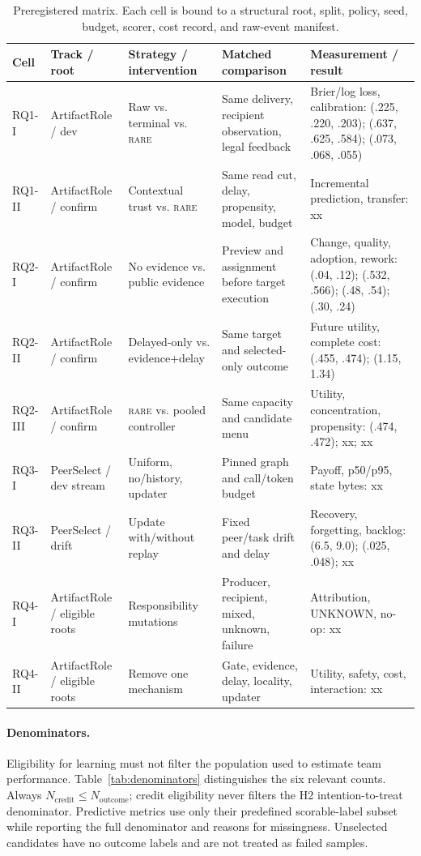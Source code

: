 \documentclass[sigconf,anonymous]{aamas}
\newcommand{\rare}{\textsc{rare}}
\begin{document}
\begin{table}[t]
\centering\small
\setlength{\tabcolsep}{2.6pt}
\begin{tabular}{p{}p{}p{}p{}p{}}
\toprule
Cell & Track / root & Strategy / intervention & Matched comparison & Measurement / result \\
\midrule
RQ1-I & ArtifactRole / dev & Raw vs. terminal vs. \rare{} & Same delivery, recipient observation, legal feedback & Brier/log loss, calibration: (.225, .220, .203); (.637, .625, .584); (.073, .068, .055) \\
RQ1-II & ArtifactRole / confirm & Contextual trust vs. \rare{} & Same read cut, delay, propensity, model, budget & Incremental prediction, transfer: xx \\
RQ2-I & ArtifactRole / confirm & No evidence vs. public evidence & Preview and assignment before target execution & Change, quality, adoption, rework: (.04, .12); (.532, .566); (.48, .54); (.30, .24) \\
RQ2-II & ArtifactRole / confirm & Delayed-only vs. evidence+delay & Same target and selected-only outcome & Future utility, complete cost: (.455, .474); (1.15, 1.34) \\
RQ2-III & ArtifactRole / confirm & \rare{} vs. pooled controller & Same capacity and candidate menu & Utility, concentration, propensity: (.474, .472); xx; xx \\
RQ3-I & PeerSelect / dev stream & Uniform, no/history, updater & Pinned graph and call/token budget & Payoff, p50/p95, state bytes: xx \\
RQ3-II & PeerSelect / drift & Update with/without replay & Fixed peer/task drift and delay & Recovery, forgetting, backlog: (6.5, 9.0); (.025, .048); xx \\
RQ4-I & ArtifactRole / eligible roots & Responsibility mutations & Producer, recipient, mixed, unknown, failure & Attribution, UNKNOWN, no-op: xx \\
RQ4-II & ArtifactRole / eligible roots & Remove one mechanism & Gate, evidence, delay, locality, updater & Utility, safety, cost, interaction: xx \\
\bottomrule
\end{tabular}
\caption{Preregistered matrix. Each cell is bound to a structural root, split, policy, seed, budget, scorer, cost record, and raw-event manifest.}
\label{tab:matrix}
\end{table}

\paragraph{Denominators.} Eligibility for learning must not filter the population used to estimate team performance. Table~\ref{tab:denominators} distinguishes the six relevant counts. Always $N_{\mathrm{credit}}\leq N_{\mathrm{outcome}}$; credit eligibility never filters the H2 intention-to-treat denominator. Predictive metrics use only their predefined scorable-label subset while reporting the full denominator and reasons for missingness. Unselected candidates have no outcome labels and are not treated as failed samples.
\end{document}
